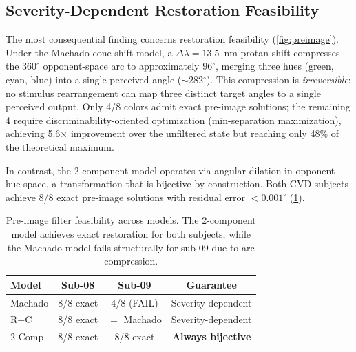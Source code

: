 \documentclass{article}
\begin{document}
\subsection{Severity-Dependent Restoration Feasibility}

The most consequential finding concerns restoration feasibility (\cref{fig:preimage}).
Under the Machado cone-shift model, a $\Delta\lambda = 13.5$~nm protan shift compresses the 360$^\circ$ opponent-space arc to approximately 96$^\circ$, merging three hues (green, cyan, blue) into a single perceived angle ($\sim$282$^\circ$).
This compression is \emph{irreversible}: no stimulus rearrangement can map three distinct target angles to a single perceived output.
Only 4/8 colors admit exact pre-image solutions; the remaining 4 require discriminability-oriented optimization (min-separation maximization), achieving 5.6$\times$ improvement over the unfiltered state but reaching only 48\% of the theoretical maximum.

In contrast, the 2-component model operates via angular dilation in opponent hue space, a transformation that is bijective by construction.
Both CVD subjects achieve 8/8 exact pre-image solutions with residual error $< 0.001^\circ$ (\cref{tab:preimage}).

\begin{table}[t]
  \caption{Pre-image filter feasibility across models. The 2-component model achieves exact restoration for both subjects, while the Machado model fails structurally for sub-09 due to arc compression.}
  \label{tab:preimage}
  \begin{center}
    \begin{small}
      \begin{tabular}{lccc}
        \toprule
        Model & Sub-08 & Sub-09 & Guarantee \\
        \midrule
        Machado   & 8/8 exact  & 4/8 (FAIL)  & Severity-dependent \\
        R+C       & 8/8 exact  & $=$ Machado & Severity-dependent \\
        2-Comp    & 8/8 exact  & 8/8 exact   & \textbf{Always bijective} \\
        \bottomrule
      \end{tabular}
    \end{small}
  \end{center}
  \vskip -0.1in
\end{table}
\end{document}
